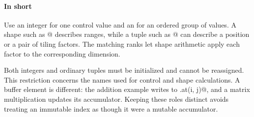 \paragraph*{In short}

Use an integer for one control value and an \co@ituple@ for an ordered group of values. A shape such as \co@[7, 14]@ describes ranges, while a tuple such as @ can describe a position or a pair of tiling factors. The matching ranks let shape arithmetic apply each factor to the corresponding dimension.

Both integers and ordinary tuples must be initialized and cannot be reassigned. This restriction concerns the names used for control and shape calculations. A buffer element is different: the addition example writes to \co@output.at(i, j)@, and a matrix multiplication updates its accumulator. Keeping these roles distinct avoids treating an immutable index as though it were a mutable accumulator.
